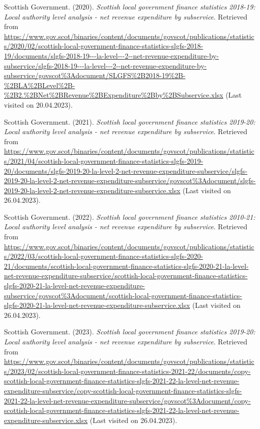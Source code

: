 \documentclass[
  12pt,
]{article}
\newlength{\cslhangindent}
\newlength{\cslentryspacingunit} %
\newenvironment{CSLReferences}[2] %
 {%
  \setlength{\parindent}{0pt}
  \ifodd #1
  \let\oldpar\par
  \def\par{\hangindent=\cslhangindent\oldpar}
  \fi
  \setlength{\parskip}{#2\cslentryspacingunit}
 }%
 {}
\begin{document}
\begin{CSLReferences}{1}{0}
\leavevmode{}%
Scottish Government. (2020). \emph{Scottish local government finance statistics 2018-19: Local authority level analysis - net revenue expenditure by subservice}. Retrieved from \url{https://www.gov.scot/binaries/content/documents/govscot/publications/statistics/2020/02/scottish-local-government-finance-statistics-slgfs-2018-19/documents/slgfs-2018-19---la-level---2--net-revenue-expenditure-by-subservice/slgfs-2018-19---la-level---2--net-revenue-expenditure-by-subservice/govscot\%3Adocument/SLGFS\%2B2018-19\%2B-\%2BLA\%2BLevel\%2B-\%2B2.\%2BNet\%2BRevenue\%2BExpenditure\%2Bby\%2BSubservice.xlsx} (Last visited on 20.04.2023).

\leavevmode{}%
Scottish Government. (2021). \emph{Scottish local government finance statistics 2019-20: Local authority level analysis - net revenue expenditure by subservice}. Retrieved from \url{https://www.gov.scot/binaries/content/documents/govscot/publications/statistics/2021/04/scottish-local-government-finance-statistics-slgfs-2019-20/documents/slgfs-2019-20-la-level-2-net-revenue-expenditure-subservice/slgfs-2019-20-la-level-2-net-revenue-expenditure-subservice/govscot\%3Adocument/slgfs-2019-20-la-level-2-net-revenue-expenditure-subservice.xlsx} (Last visited on 26.04.2023).

\leavevmode{}%
Scottish Government. (2022). \emph{Scottish local government finance statistics 2010-21: Local authority level analysis - net revenue expenditure by subservice}. Retrieved from \url{https://www.gov.scot/binaries/content/documents/govscot/publications/statistics/2022/03/scottish-local-government-finance-statistics-slgfs-2020-21/documents/scottish-local-government-finance-statistics-slgfs-2020-21-la-level-net-revenue-expenditure-subservice/scottish-local-government-finance-statistics-slgfs-2020-21-la-level-net-revenue-expenditure-subservice/govscot\%3Adocument/scottish-local-government-finance-statistics-slgfs-2020-21-la-level-net-revenue-expenditure-subservice.xlsx} (Last visited on 26.04.2023).

\leavevmode{}%
Scottish Government. (2023). \emph{Scottish local government finance statistics 2019-20: Local authority level analysis - net revenue expenditure by subservice}. Retrieved from \url{https://www.gov.scot/binaries/content/documents/govscot/publications/statistics/2023/02/scottish-local-government-finance-statistics-2021-22/documents/copy-scottish-local-government-finance-statistics-slgfs-2021-22-la-level-net-revenue-expenditure-subservice/copy-scottish-local-government-finance-statistics-slgfs-2021-22-la-level-net-revenue-expenditure-subservice/govscot\%3Adocument/copy-scottish-local-government-finance-statistics-slgfs-2021-22-la-level-net-revenue-expenditure-subservice.xlsx} (Last visited on 26.04.2023).


\end{CSLReferences}
\end{document}
